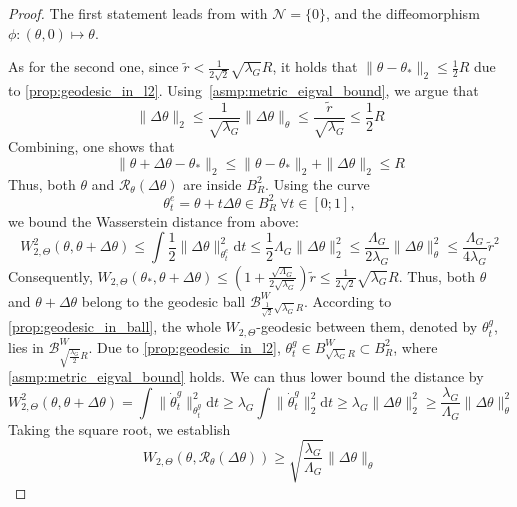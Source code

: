 \documentclass{article} %
\numberwithin{equation}{subsection}
\numberwithin{theorem}{section}
\newcommand{\dd}{\mathrm{d}}
\newcommand{\cN}{\mathcal{N}}
\newcommand{\cR}{\mathcal{R}}
\newcommand{\cB}{\mathcal{B}}
\begin{document}
    \begin{proof}
        The first statement leads from \cite[Proposition {4.1.2}]{absil2009optimization} with $\cN = \{ 0\}$, and the diffeomorphism $\phi: (\theta, 0) \mapsto \theta$.

        As for the second one, since $\tilde{r} < \frac{1}{2\sqrt{2}}\sqrt{\lambda_{G}}R$, it holds that $\| \theta - \theta_*\|_2 \leq \frac{1}{2}R$ due to \autoref{prop:geodesic_in_l2}.
        Using~\autoref{asmp:metric_eigval_bound}, we argue that
        \[
            \|\Delta\theta\|_2 \leq \frac{1}{\sqrt{\lambda_{G}}}\|\Delta\theta\|_\theta \leq \frac{\tilde{r}}{\sqrt{\lambda_{G}}} \leq \frac{1}{2}R
        \]
        Combining, one shows that
        \begin{equation}
            \|\theta + \Delta\theta - \theta_*\|_2 \leq \|\theta - \theta_*\|_2 + \| \Delta\theta\|_2 \leq R
        \end{equation}
        Thus, both $\theta$ and $\cR_{\theta}(\Delta\theta)$ are inside $B^2_R$.
        Using the curve 
        $$
            \theta^e_t = \theta + t\Delta\theta \in B^2_R\ \forall t \in [0;1],
        $$ we bound  the Wasserstein distance from above:
        \[
            W_{2,\Theta}^2(\theta, \theta + \Delta\theta) 
                \leq \int \frac{1}{2}\| \Delta\theta\|^2_{\theta^e_t}\dd t 
                \leq \frac{1}{2}{\Lambda_{G}} \|\Delta\theta\|_2^2
                \leq \frac{\Lambda_{G}}{2\lambda_{G}} \|\Delta\theta\|_\theta^2 
                \leq  \frac{\Lambda_{G}}{4\lambda_{G}} \tilde{r}^2
        \]   
        Consequently, $W_{2, \Theta}(\theta_*, \theta + \Delta\theta) \leq (1 + \frac{\sqrt{\Lambda_{G}}}{2\sqrt{\lambda_{G}}})\tilde{r} \leq \frac{1}{2\sqrt{2}}\sqrt{\lambda_{G}}R$.
        Thus, both $\theta$ and $\theta + \Delta\theta$ belong to the geodesic ball $\cB^W_{\frac{1}{\sqrt{2}}\sqrt{\lambda_{G}}R}$.
        According to \autoref{prop:geodesic_in_ball}, the whole $W_{2,\Theta}$-geodesic  between them, denoted by $\theta^g_t$, lies in $\cB^W_{\sqrt{\frac{\lambda_{G}}{2}}R}$. 
        Due to \autoref{prop:geodesic_in_l2}, $\theta^g_t \in B^W_{\sqrt{\lambda_{G}}R} \subset B^2_R$, where \autoref{asmp:metric_eigval_bound} holds.
        We can thus lower bound the distance by
        \[
            W^2_{2,\Theta}(\theta, \theta + \Delta\theta) 
            = \int \| \dot\theta^g_t\|^2_{\theta^g_t}\dd t 
            \geq \lambda_{G} \int \| \dot\theta^g_t\|^2_2\dd t
            \geq \lambda_{G} \|\Delta\theta\|_2^2
            \geq \frac{\lambda_{G}}{\Lambda_{G}} \|\Delta\theta\|_\theta^2
        \]
        Taking the square root, we establish
        \[
            W_{2,\Theta}\left(\theta, \cR_{\theta}(\Delta\theta) \right) \geq \sqrt{\frac{\lambda_{G}}{\Lambda_{G}}}\| \Delta\theta\|_{\theta}
        \]
    \end{proof} 
\end{document}
